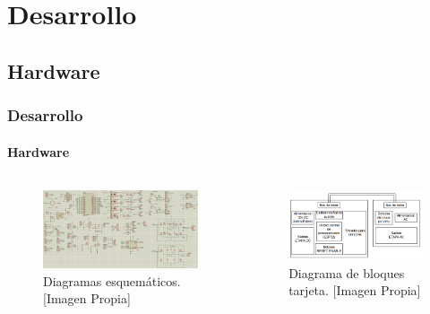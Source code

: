 \section{Desarrollo}

\subsection{Hardware}
\begin{frame}[t]
\frametitle{Desarrollo}
\framesubtitle{Hardware}

\begin{columns}
	
\begin{figure}
	\centering
	\caption{Diagramas esquemáticos. [Imagen Propia]}
	\label{fig:esq}
	\includegraphics[width=\linewidth]{Imagenes/Proteus}
\end{figure}

\begin{figure}
	\caption{Diagrama de bloques tarjeta. [Imagen Propia]}
	\label{fig:prot}
	\includegraphics[width=\linewidth]{Imagenes/Tarjeta}
\end{figure}

\end{columns}
\end{frame}

